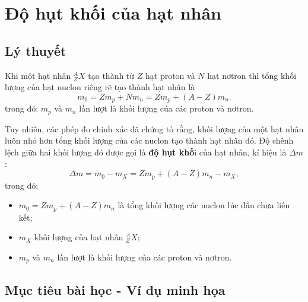 
\chapter[Độ hụt khối của hạt nhân]{Độ hụt khối của hạt nhân}
\section{Lý thuyết}

Khi một hạt nhân $^A_Z X$ tạo thành từ $Z$ hạt proton và $N$ hạt nơtron thì tổng khối lượng của hạt nuclon riêng rẽ tạo thành hạt nhân là
\begin{equation}
	m_0=Z m_p+N m_n=Z m_p+ (A-Z) m_n.
\end{equation}
trong đó: $m_p$ và $m_n$ lần lượt là khối lượng của các proton và nơtron.

Tuy nhiên, các phép đo chính xác đã chứng tỏ rằng, khối lượng của một hạt nhân luôn nhỏ hơn tổng khối lượng của các nuclon tạo thành hạt nhân đó. Độ chênh lệch giữa hai khối lượng đó được gọi là \textbf{độ hụt khố}i của hạt nhân, kí hiệu là $\Delta m$:
\begin{equation}
	\Delta m = m_0 - m_X = Z m_p+ (A-Z) m_n - m_X,
\end{equation}
trong đó:
\begin{itemize}
	\item $m_0=Z m_p+ (A-Z) m_n$ là tổng khối lượng các nuclon lúc đầu chưa liên kết;
	\item $m_X$ khối lượng của hạt nhân $^A_Z X$;
	\item $m_p$ và $m_n$ lần lượt là khối lượng của các proton và nơtron.
\end{itemize}


\section{Mục tiêu bài học - Ví dụ minh họa}


